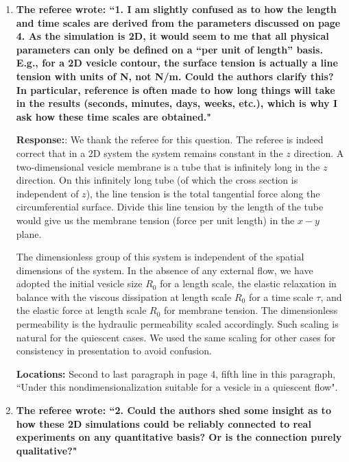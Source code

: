 \documentclass[11pt]{article}
\begin{document}
\begin{enumerate}

\item {\bf The referee wrote: ``1. I am slightly confused as to how the length and time scales are derived from the parameters discussed on page 4. As the simulation is 2D, it would seem to me that all physical parameters can only be defined on a “per unit of length” basis. E.g., for a 2D vesicle contour, the surface tension is actually a line tension with units of N, not N/m. Could the authors clarify this?
In particular, reference is often made to how long things will take in the results (seconds,
minutes, days, weeks, etc.), which is why I ask how these time scales are obtained."}

\noindent
{\bf Response:}: We thank the referee for this question. The referee is indeed correct that in a 2D system the system remains constant in the $z$ direction. A two-dimensional vesicle membrane is a tube that is infinitely long in the $z$ direction.
On this infinitely long tube (of which the cross section is independent of $z$), the line tension is the total tangential force along the circumferential surface. Divide this line tension by the length of the tube would give us the membrane tension (force per unit length) in the $x-y$ plane.  
%

The dimensionless group of this system is independent of the spatial dimensions of the system. In the absence of any external flow, we have adopted the initial vesicle size $R_0$ for a length scale,  the elastic relaxation in balance with the viscous dissipation at  length scale $R_0$ for a time scale $\tau$, and the elastic force at length scale $R_0$ for membrane tension. The dimensionless permeability is the hydraulic permeability scaled accordingly. Such scaling is natural for the quiescent cases. We used the same scaling for other cases for consistency in presentation to avoid confusion.

\noindent
{\bf Locations:} Second to last paragraph in page 4, fifth line in this paragraph, ``Under this nondimensionalization suitable for a vesicle in a quiescent flow".


\item {\bf The referee wrote: ``2. Could the authors shed some insight as to how these 2D simulations could be reliably connected to real experiments on any quantitative basis? Or is the connection purely
qualitative?"}


\end{enumerate}
\end{document}
